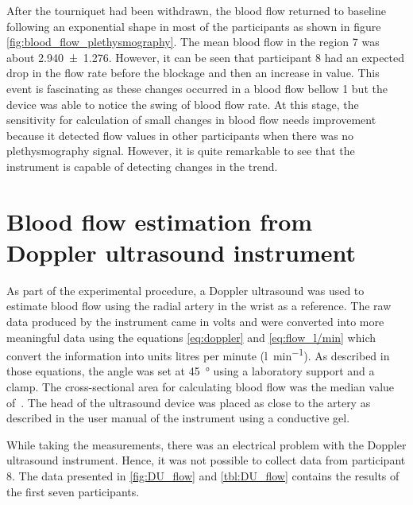 After the tourniquet had been withdrawn, the blood flow returned to baseline following an exponential shape  in most of the participants as shown in figure \ref{fig:blood_flow_plethysmography}. The mean blood flow in the region 7 was about \SI{2.940(1276)}{\bfv}. However, it can be seen that participant 8 had an expected drop in the flow rate before the blockage and then an increase in value. This event is fascinating as these changes occurred in a blood flow bellow \SI{1}{\bfv} but the device was able to notice the swing of blood flow rate. At this stage, the sensitivity for calculation of small changes in blood flow needs improvement because it detected flow values in other participants when there was no plethysmography signal. However, it is quite remarkable to see that the instrument is capable of detecting changes in the trend.

\section{Blood flow estimation from Doppler ultrasound instrument}
\label{section results 6}
As part of the experimental procedure, a Doppler ultrasound was used to estimate blood flow using the radial artery in the wrist as a reference. The raw data produced by the instrument came in volts and were converted into more meaningful data using the equations \ref {eq:doppler} and \ref {eq:flow_l/min} which convert the information into units litres per minute (\si{\litre\per\minute}). As described in those equations, the angle was set at \SI{45}{\degree} using a laboratory support and a clamp. The cross-sectional area for calculating blood flow was the median value of~\cite {ashraf2010size}. The head of the ultrasound device was placed as close to the artery as described in the user manual of the instrument using a conductive gel.

While taking the measurements, there was an electrical problem with the Doppler ultrasound instrument. Hence, it was not possible to collect data from participant 8. The data presented in \ref{fig:DU_flow} and \ref{tbl:DU_flow} contains the results of the first seven participants.

